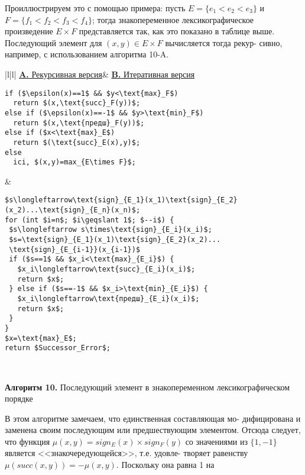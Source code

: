 \hspace*{15pt}Проиллюстрируем это с помощью примера: пусть $E=\{e_1<e_2<e_3\}$\linebreak
и $F=\{f_1<f_2<f_3<f_4\}$; тогда знакопеременное лексикографическое\linebreak
произведение $E\times F$ представляется так, как это показано в таблице\linebreak
выше.\newline
\hspace*{15pt}Последующий элемент для $(x,y)\in E\times F$ вычисляется тогда рекур-\linebreak
сивно, например, с использованием алгоритма 10-A.
\begin{center}
\begin{tabular}{|l|l|}
\hline
\hspace*{20pt}\underline{\textbf{A.} Рекурсивная версия}&
\hspace*{5pt}\underline{\textbf{B.} Итеративная версия}\\
{\begin{lstlisting}[mathescape=true, frame=none]
if ($\epsilon(x)==1$ && $y<\text{max}_F$)
  return $(x,\text{succ}_F(y))$;
else if ($\epsilon(x)==-1$ && $y>\text{min}_F$)
  return $(x,\text{предш}_F(y))$;
else if ($x<\text{max}_E$)
  return $(\text{succ}_E(x),y)$;
else
  ici, $(x,y)=max_{E\times F}$;
\end{lstlisting}}
&
{\begin{lstlisting}[mathescape=true, frame=none]
$s\longleftarrow\text{sign}_{E_1}(x_1)\text{sign}_{E_2}(x_2)...\text{sign}_{E_n}(x_n)$;
for (int $i=n$; $i\geqslant 1$; $--i$) {
 $s\longleftarrow s\times\text{sign}_{E_i}(x_i)$;
 $s=\text{sign}_{E_1}(x_1)\text{sign}_{E_2}(x_2)...
 \text{sign}_{E_{i-1}}(x_{i-1})$
 if ($s==1$ && $x_i<\text{max}_{E_i}$) {
   $x_i\longleftarrow\text{succ}_{E_i}(x_i)$;
   return $x$;
 } else if ($s==-1$ && $x_i>\text{min}_{E_i}$) {
   $x_i\longleftarrow\text{предш}_{E_i}(x_i)$;
   return $x$;
 }
}
$x=\text{max}_E$;
return $Successor_Error$;
\end{lstlisting}}\\
\hline
\end{tabular}
\end{center}
\begin{center}
\textbf{Алгоритм 10.} Последующий элемент в знакопеременном\newline
лексикографическом порядке
\end{center}
\hspace*{15pt}В этом алгоритме замечаем, что единственная составляющая мо-\linebreak
дифицирована и заменена своим последующим или предшествующим\linebreak
элементом. Отсюда следует, что функция $\mu(x,y)=sign_E(x)\times sign_F(y)$\linebreak
со значениями из $\{1, -1\}$ является <<знакочередующейся>>, т.е. удовле-\linebreak
творяет равенству $\mu(succ(x,y))=-\mu(x,y)$. Поскольку она равна 1 на\linebreak
\newpage



